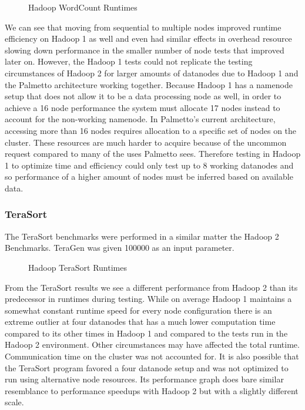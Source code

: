 \documentclass[conference]{IEEEtran}
\begin{document}
						\begin{figure}[h]
                   					\begin{center}
                       						
                        						\caption{Hadoop WordCount Runtimes}
                    				\end{center}
                  			\end{figure}

					We can see that moving from sequential to multiple nodes improved runtime efficiency on Hadoop 1 as well and even had similar effects in overhead resource slowing down performance in the smaller number of node tests that improved later on. However, the Hadoop 1 tests could not replicate the testing circumstances of Hadoop 2 for larger amounts of datanodes due to Hadoop 1 and the Palmetto architecture working together. Because Hadoop 1 has a namenode setup that does not allow it to be a data processing node as well, in order to achieve a 16 node performance the system must allocate 17 nodes instead to account for the non-working namenode. In Palmetto’s current architecture, accessing more than 16 nodes requires allocation to a specific set of nodes on the cluster. These resources are much harder to acquire because of the uncommon request compared to many of the uses Palmetto sees. Therefore testing in Hadoop 1 to optimize time and efficiency could only test up to 8 working datanodes and so performance of a higher amount of nodes must be inferred based on
available data.
					\subsubsection{TeraSort}
						The TeraSort benchmarks were performed in a similar matter the Hadoop 2 Benchmarks. TeraGen was given 100000 as an input parameter.
						\begin{figure}[h]
                   					\begin{center}
                       						
                        						\caption{Hadoop TeraSort Runtimes}
                    				\end{center}
                  			\end{figure}
					
					From the TeraSort results we see a different performance from Hadoop 2 than its predecessor in runtimes during testing. While on average Hadoop 1 maintains a somewhat constant runtime speed for every node configuration there is an extreme outlier at four datanodes that has a much lower computation time compared to its other times in Hadoop 1 and compared to the tests run in the Hadoop 2 environment. Other circumstances may have affected the total runtime. Communication time on the cluster was not accounted for.  It is also possible that the TeraSort program favored a four datanode setup and was not optimized to run using alternative node resources. Its performance graph does bare similar resemblance to performance speedups with Hadoop 2 but with a slightly different scale.
\end{document}
